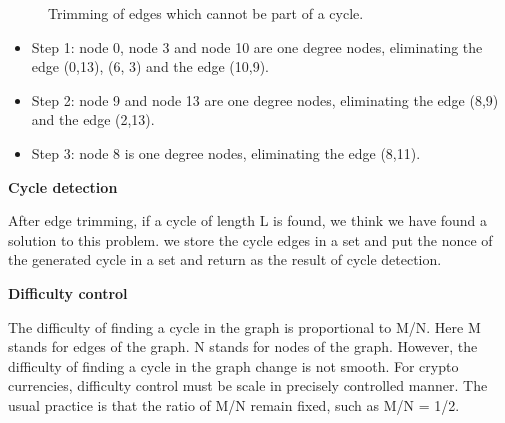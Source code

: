 \documentclass[a4paper,11pt]{article}
\begin{document}
\begin{figure}[ht]
	\centerline{%
	}
	\caption{Trimming of edges which cannot be part of a cycle.}
\end{figure}

\begin{itemize}
	\item Step 1: node 0, node 3 and node 10 are one degree nodes, eliminating the edge (0,13), (6, 3) and the edge (10,9).
	\item Step 2: node 9 and node 13 are one degree nodes, eliminating the edge (8,9) and the edge (2,13).
	\item Step 3: node 8 is one degree nodes, eliminating the edge (8,11).
\end{itemize}


\textbf{Cycle detection}

After edge trimming, if a cycle of length L is found, we think we have found a solution to this problem.
we store the cycle edges in a set and put the nonce of the generated cycle in a set and
return as the result of cycle detection.


\textbf{Difficulty control}

The difficulty of finding a cycle in the graph is proportional to M/N. Here M stands for edges of the graph.
N stands for nodes of the graph. However, the difficulty of finding a cycle in the graph change is not smooth.
For crypto currencies, difficulty control must be scale in precisely controlled manner. The usual practice is
that the ratio of M/N remain fixed, such as M/N = 1/2.
\end{document}
